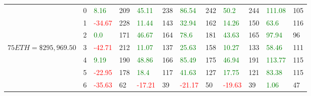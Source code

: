 \begin{table}[htb!]
\begin{adjustwidth}{-0.9in}{-0.9in}
\begin{tabular}{|p{5em}|p{2em}|p{3em}|p{3em}|p{3em}|p{3em}|p{3em}|p{3em}|p{3em}|p{3em}|p{3em}|p{3em}|}
            & 0 & \textcolor{green}{8.16} & 209 & \textcolor{green}{45.11} & 238 & \textcolor{green}{86.54} & 242 & \textcolor{green}{50.2} & 244 & \textcolor{green}{111.08} & 105\\\cline{3-12}
            & 1 & \textcolor{red}{-34.67} & 228 & \textcolor{green}{11.44} & 143 & \textcolor{green}{32.94} & 162 & \textcolor{green}{14.26} & 150 & \textcolor{green}{63.6} & 116\\\cline{3-12}
            & 2 & \textcolor{green}{0.0} & 171 & \textcolor{green}{46.67} & 164 & \textcolor{green}{78.6} & 181 & \textcolor{green}{43.63} & 165 & \textcolor{green}{97.94} & 96\\\cline{3-12}
            $75 ETH = \$295,969.50$ & 3 & \textcolor{red}{-42.71} & 212 & \textcolor{green}{11.07} & 137 & \textcolor{green}{25.63} & 158 & \textcolor{green}{10.27} & 133 & \textcolor{green}{58.46} & 111\\[-3ex]\cline{3-12}
            & 4 & \textcolor{green}{9.19} & 190 & \textcolor{green}{48.86} & 166 & \textcolor{green}{85.49} & 175 & \textcolor{green}{46.94} & 191 & \textcolor{green}{113.77} & 115\\\cline{3-12}
            & 5 & \textcolor{red}{-22.95} & 178 & \textcolor{green}{18.4} & 117 & \textcolor{green}{41.63} & 127 & \textcolor{green}{17.75} & 121 & \textcolor{green}{83.38} & 115\\\cline{3-12}
            & 6 & \textcolor{red}{-35.63} & 62 & \textcolor{red}{-17.21} & 39 & \textcolor{red}{-21.17} & 50 & \textcolor{red}{-19.63} & 39 & \textcolor{green}{1.06} & 47\\\hline\hline


\end{tabular}
\end{adjustwidth}
\end{table}
